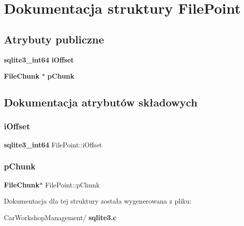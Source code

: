 \section{Dokumentacja struktury File\+Point}
\label{struct_file_point}
\subsection*{Atrybuty publiczne}
\begin{DoxyCompactItemize}
\item 
\textbf{ sqlite3\+\_\+int64} \textbf{ i\+Offset}
\item 
\textbf{ File\+Chunk} $\ast$ \textbf{ p\+Chunk}
\end{DoxyCompactItemize}


\subsection{Dokumentacja atrybutów składowych}
\mbox{\label{struct_file_point_a00a345e479cd37ebeb9e6ed475eb4112}} 
\subsubsection{iOffset}
{\footnotesize\ttfamily \textbf{ sqlite3\+\_\+int64} File\+Point\+::i\+Offset}

\mbox{\label{struct_file_point_aa17216d9d2559f14a00a2c72a8959298}} 
\subsubsection{pChunk}
{\footnotesize\ttfamily \textbf{ File\+Chunk}$\ast$ File\+Point\+::p\+Chunk}



Dokumentacja dla tej struktury została wygenerowana z pliku\+:\begin{DoxyCompactItemize}
\item 
Car\+Workshop\+Management/\textbf{ sqlite3.\+c}\end{DoxyCompactItemize}
